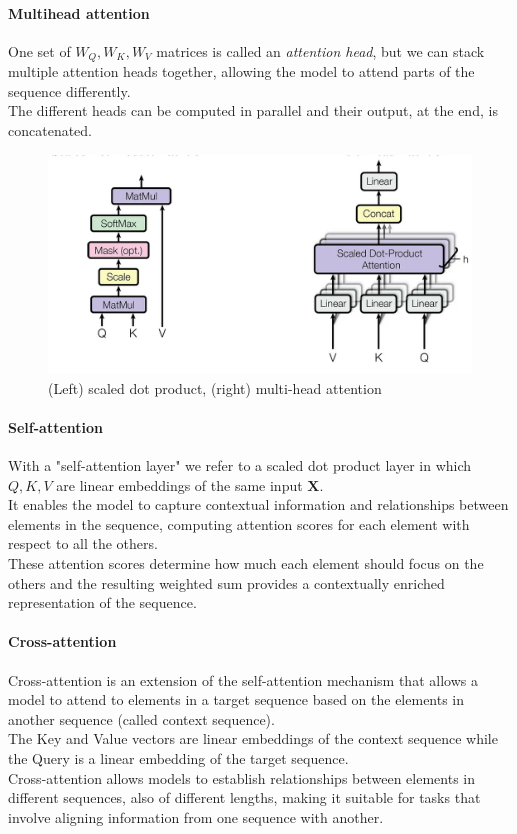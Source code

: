 \paragraph*{Multihead attention}
One set of $W_Q,W_K,W_V$ matrices is called an \textit{attention head}, but we can stack multiple attention heads together, allowing the model to attend parts of the sequence differently.\\
The different heads can be computed in parallel and their output, at the end, is concatenated.

\begin{figure}[h!]
    \centering
    \includegraphics[width=0.75\linewidth]{fig//chap05-stats/multihead_attention.png}
    \caption{(Left) scaled dot product, (right) multi-head attention}
    \label{fig:multihead}
\end{figure}

\paragraph*{Self-attention} With a "self-attention layer" we refer to a scaled dot product layer in which $Q,K,V$ are linear embeddings of the same input $\bm{X}$.\\
It enables the model to capture contextual information and relationships between elements in the sequence, computing attention scores for each element with respect to all the others.\\
These attention scores determine how much each element should focus on the others and the resulting weighted sum provides a contextually enriched representation of the sequence.

\paragraph*{Cross-attention}
Cross-attention is an extension of the self-attention mechanism that allows a model to attend to elements in a target sequence based on the elements in another sequence (called context sequence).\\
The Key and Value vectors are linear embeddings of the context sequence while the Query is a linear embedding of the target sequence.\\
Cross-attention allows models to establish relationships between elements in different sequences, also of different lengths, making it suitable for tasks that involve aligning information from one sequence with another.

